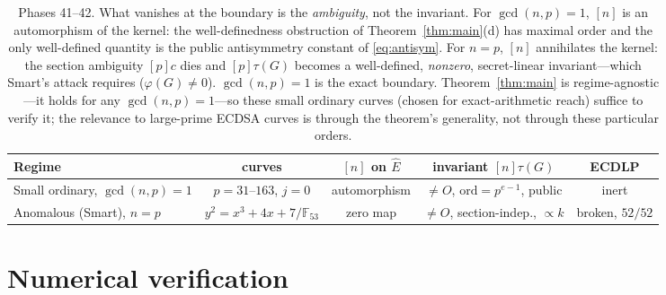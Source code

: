 \documentclass[11pt]{article}
\theoremstyle{definition}
\newcommand{\Ehat}{\widehat{E}}
\newcommand{\ord}{\mathrm{ord}}
\begin{document}
\begin{table}[t]
\centering
\small
\begin{tabular}{lcccc}
\toprule
Regime & curves & $[n]$ on $\Ehat$ & invariant $[n]\tau(G)$ & ECDLP\\
\midrule
Small ordinary, $\gcd(n,p)=1$ & $p=31$--$163$, $j{=}0$ & automorphism &
  $\neq O$, $\ord=p^{e-1}$, public & inert\\
Anomalous (Smart), $n=p$ & $y^2{=}x^3{+}4x{+}7/\mathbb F_{53}$ & zero map &
  $\neq O$, section-indep., $\propto k$ & broken, $52/52$\\
\bottomrule
\end{tabular}
\caption{Phases 41--42. What vanishes at the boundary is the
\emph{ambiguity}, not the invariant. For $\gcd(n,p)=1$, $[n]$ is an
automorphism of the kernel: the well-definedness obstruction of
Theorem~\ref{thm:main}(d) has maximal order and the only well-defined
quantity is the public antisymmetry constant of \eqref{eq:antisym}. For
$n=p$, $[n]$ annihilates the kernel: the section ambiguity $[p]c$ dies
and $[p]\tau(G)$ becomes a well-defined, \emph{nonzero}, secret-linear
invariant---which Smart's attack requires ($\varphi(G)\neq 0$).
$\gcd(n,p)=1$ is the exact boundary. Theorem~\ref{thm:main} is
regime-agnostic---it holds for any $\gcd(n,p)=1$---so these small ordinary
curves (chosen for exact-arithmetic reach) suffice to verify it; the
relevance to large-prime ECDSA curves is through the theorem's generality,
not through these particular orders.}
\label{tab:boundary}
\end{table}

\section{Numerical verification}\label{sec:verification}
\end{document}
